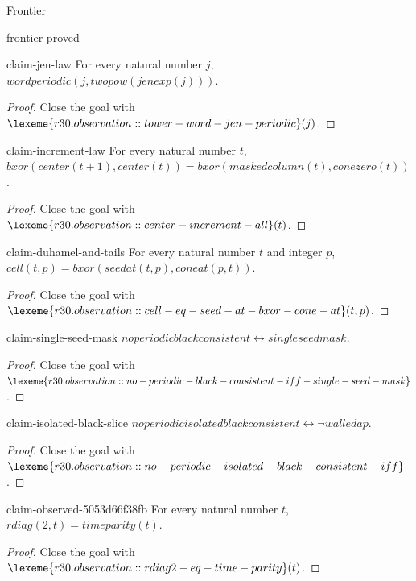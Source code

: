 \begin{lexlean}{Frontier}
\begin{section}{frontier-proved}
\begin{theorem}{claim-jen-law}
For every natural number \(j\), \(wordperiodic(j, twopow(jenexp(j)))\).
\begin{proof}
Close the goal with \(\lexeme{r30.observation::tower-word-jen-periodic}(j)\).
\end{proof}
\end{theorem}

\begin{theorem}{claim-increment-law}
For every natural number \(t\), \(bxor(center(t + 1), center(t)) = bxor(maskedcolumn(t), conezero(t))\).
\begin{proof}
Close the goal with \(\lexeme{r30.observation::center-increment-all}(t)\).
\end{proof}
\end{theorem}

\begin{theorem}{claim-duhamel-and-tails}
For every natural number \(t\) and integer \(p\), \(cell(t, p) = bxor(seedat(t, p), coneat(p, t))\).
\begin{proof}
Close the goal with \(\lexeme{r30.observation::cell-eq-seed-at-bxor-cone-at}(t, p)\).
\end{proof}
\end{theorem}

\begin{theorem}{claim-single-seed-mask}
\(noperiodicblackconsistent ↔ singleseedmask\).
\begin{proof}
Close the goal with \(\lexeme{r30.observation::no-periodic-black-consistent-iff-single-seed-mask}\).
\end{proof}
\end{theorem}

\begin{theorem}{claim-isolated-black-slice}
\(noperiodicisolatedblackconsistent ↔ ¬ walledap\).
\begin{proof}
Close the goal with \(\lexeme{r30.observation::no-periodic-isolated-black-consistent-iff}\).
\end{proof}
\end{theorem}

\begin{theorem}{claim-observed-5053d66f38fb}
For every natural number \(t\), \(rdiag(2, t) = timeparity(t)\).
\begin{proof}
Close the goal with \(\lexeme{r30.observation::rdiag2-eq-time-parity}(t)\).
\end{proof}
\end{theorem}


\end{section}
\end{lexlean}
